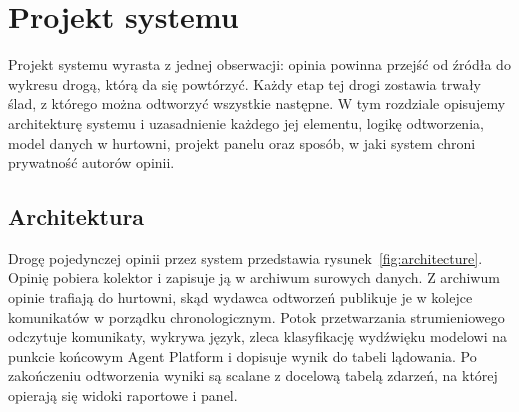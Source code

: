 \chapter{Projekt systemu}
\label{chap:design}


Projekt systemu wyrasta z jednej obserwacji: opinia powinna przejść od źródła do wykresu drogą, którą da się powtórzyć.
Każdy etap tej drogi zostawia trwały ślad, z którego można odtworzyć wszystkie następne.
W tym rozdziale opisujemy architekturę systemu i uzasadnienie każdego jej elementu, logikę odtworzenia, model danych w hurtowni, projekt panelu oraz sposób, w jaki system chroni prywatność autorów opinii.

\section{Architektura}
\label{sec:design-architecture}

Drogę pojedynczej opinii przez system przedstawia rysunek~\ref{fig:architecture}.
Opinię pobiera kolektor i zapisuje ją w archiwum surowych danych.
Z archiwum opinie trafiają do hurtowni, skąd wydawca odtworzeń publikuje je w kolejce komunikatów w porządku chronologicznym.
Potok przetwarzania strumieniowego odczytuje komunikaty, wykrywa język, zleca klasyfikację wydźwięku modelowi na punkcie końcowym Agent Platform i dopisuje wynik do tabeli lądowania.
Po zakończeniu odtworzenia wyniki są scalane z docelową tabelą zdarzeń, na której opierają się widoki raportowe i panel.

